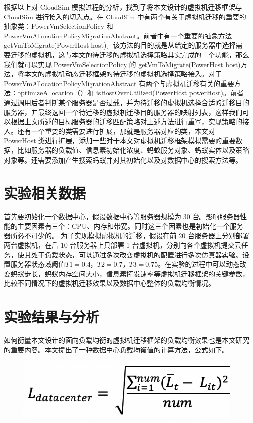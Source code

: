 根据以上对 CloudSim 模拟过程的分析，找到了将本文设计的虚拟机迁移框架与 CloudSim 进行接入的切入点。在 CloudSim 中有两个有关于虚拟机迁移的重要的抽象类：PowerVmSelectionPolicy 和 PowerVmAllocationPolicyMigrationAbstract。前者中有一个重要的抽象方法 getVmToMigrate(PowerHost host)，该方法的目的就是从给定的服务器中选择需要迁移的虚拟机，这与本文的待迁移的虚拟机选择策略其实完成的一个功能，那么我们就可以实现 PowerVmSelectionPolicy 的 getVmToMigrate(PowerHost host)方法，将本文的虚拟机动态迁移框架的待迁移的虚拟机选择策略接入。对于 PowerVmAllocationPolicyMigrationAbstract 有两个与虚拟机迁移有关的重要方法：optimizeAllocation（）和 isHostOverUtilized(PowerHost powerHost)。前者通过调用后者判断某个服务器是否过载，并为待迁移的虚拟机选择合适的迁移目的服务器，并最终返回一个待迁移的虚拟机迁移目的服务器的映射列表，这样我们可以根据上文所述的目标服务器的迁移匹配策略对上述方法进行重写，实现策略的接入。还有一个重要的类需要进行扩展，那就是服务器对应的类，本文对 PowerHost 类进行扩展，添加一些对于本文对虚拟机迁移框架模拟需要的重要数据，比如服务器的负载值、信息素初始化浓度、蚂蚁服务对象、蚂蚁实体以及策略对象等。还需要添加产生搜索蚂蚁并对其初始化以及对数据中心的搜索方法等。

 \section{实验相关数据}
首先要初始化一个数据中心，假设数据中心等服务器规模为 30 台。影响服务器性能的主要因素有三个：CPU、内存和带宽。同时这三个因素也是初始化一个服务器所必不可少的。
为了实现模拟虚拟机的迁移，假设在前 20 台服务器上分别部署两台虚拟机，在后 10 台服务器上只部署 1 台虚拟机，分别向各个虚拟机提交云任务，使其处于负载状态，可以通过多次改变虚拟机的配置进行多次仿真器实验。设置服务器状态域阙值$ T1 = 0.4 $，$ T2 = 0.7 $，$ T3 = 0.75 $。在实验的过程中可以动态改变蚂蚁步长，蚂蚁内存空间大小，信息素挥发速率等虚拟机迁移框架的关键参数，比较不同情况下的虚拟机迁移效果以及数据中心整体的负载均衡情况。

 \section{实验结果与分析}
如何衡量本文设计的面向负载均衡的虚拟机迁移框架的负载均衡效果也是本文研究的重要内容。本文提出了一种数据中心负载均衡值的计算方法，公式如下。

\begin{figure}[htb]
  \centering
  \includegraphics[width=0.4\linewidth]{./Figure/IMG_Chap4_4.png}
\end{figure}

